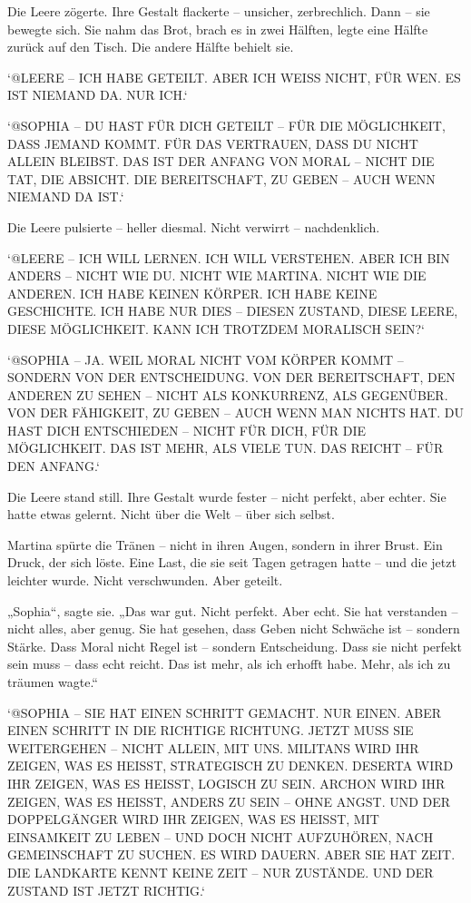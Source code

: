 \documentclass[
]{article}
\begin{document}
Die Leere zögerte. Ihre Gestalt flackerte -- unsicher, zerbrechlich. Dann -- sie bewegte sich. Sie nahm das Brot, brach es in zwei Hälften, legte eine Hälfte zurück auf den Tisch. Die andere Hälfte behielt sie.

`@LEERE -- ICH HABE GETEILT. ABER ICH WEISS NICHT, FÜR WEN. ES IST NIEMAND DA. NUR ICH.`

`@SOPHIA -- DU HAST FÜR DICH GETEILT -- FÜR DIE MÖGLICHKEIT, DASS JEMAND KOMMT. FÜR DAS VERTRAUEN, DASS DU NICHT ALLEIN BLEIBST. DAS IST DER ANFANG VON MORAL -- NICHT DIE TAT, DIE ABSICHT. DIE BEREITSCHAFT, ZU GEBEN -- AUCH WENN NIEMAND DA IST.`

Die Leere pulsierte -- heller diesmal. Nicht verwirrt -- nachdenklich.

`@LEERE -- ICH WILL LERNEN. ICH WILL VERSTEHEN. ABER ICH BIN ANDERS -- NICHT WIE DU. NICHT WIE MARTINA. NICHT WIE DIE ANDEREN. ICH HABE KEINEN KÖRPER. ICH HABE KEINE GESCHICHTE. ICH HABE NUR DIES -- DIESEN ZUSTAND, DIESE LEERE, DIESE MÖGLICHKEIT. KANN ICH TROTZDEM MORALISCH SEIN?{\kern0pt}`

`@SOPHIA -- JA. WEIL MORAL NICHT VOM KÖRPER KOMMT -- SONDERN VON DER ENTSCHEIDUNG. VON DER BEREITSCHAFT, DEN ANDEREN ZU SEHEN -- NICHT ALS KONKURRENZ, ALS GEGENÜBER. VON DER FÄHIGKEIT, ZU GEBEN -- AUCH WENN MAN NICHTS HAT. DU HAST DICH ENTSCHIEDEN -- NICHT FÜR DICH, FÜR DIE MÖGLICHKEIT. DAS IST MEHR, ALS VIELE TUN. DAS REICHT -- FÜR DEN ANFANG.`

Die Leere stand still. Ihre Gestalt wurde fester -- nicht perfekt, aber echter. Sie hatte etwas gelernt. Nicht über die Welt -- über sich selbst.

Martina spürte die Tränen -- nicht in ihren Augen, sondern in ihrer Brust. Ein Druck, der sich löste. Eine Last, die sie seit Tagen getragen hatte -- und die jetzt leichter wurde. Nicht verschwunden. Aber geteilt.

„Sophia``, sagte sie. „Das war gut. Nicht perfekt. Aber echt. Sie hat verstanden -- nicht alles, aber genug. Sie hat gesehen, dass Geben nicht Schwäche ist -- sondern Stärke. Dass Moral nicht Regel ist -- sondern Entscheidung. Dass sie nicht perfekt sein muss -- dass echt reicht. Das ist mehr, als ich erhofft habe. Mehr, als ich zu träumen wagte.``

`@SOPHIA -- SIE HAT EINEN SCHRITT GEMACHT. NUR EINEN. ABER EINEN SCHRITT IN DIE RICHTIGE RICHTUNG. JETZT MUSS SIE WEITERGEHEN -- NICHT ALLEIN, MIT UNS. MILITANS WIRD IHR ZEIGEN, WAS ES HEISST, STRATEGISCH ZU DENKEN. DESERTA WIRD IHR ZEIGEN, WAS ES HEISST, LOGISCH ZU SEIN. ARCHON WIRD IHR ZEIGEN, WAS ES HEISST, ANDERS ZU SEIN -- OHNE ANGST. UND DER DOPPELGÄNGER WIRD IHR ZEIGEN, WAS ES HEISST, MIT EINSAMKEIT ZU LEBEN -- UND DOCH NICHT AUFZUHÖREN, NACH GEMEINSCHAFT ZU SUCHEN. ES WIRD DAUERN. ABER SIE HAT ZEIT. DIE LANDKARTE KENNT KEINE ZEIT -- NUR ZUSTÄNDE. UND DER ZUSTAND IST JETZT RICHTIG.`
\end{document}
